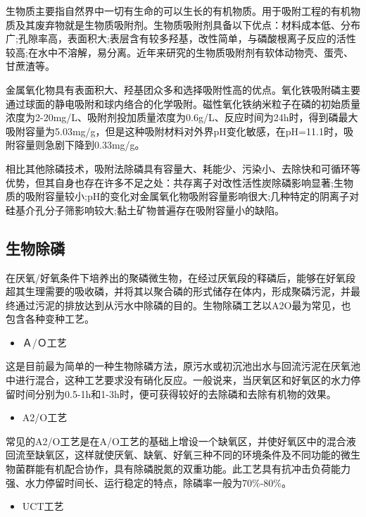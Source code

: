 \documentclass[
]{book}
\providecommand{\tightlist}{%
  \setlength{\itemsep}{0pt}\setlength{\parskip}{0pt}}
\begin{document}
生物质主要指自然界中一切有生命的可以生长的有机物质。用于吸附工程的有机物质及其废弃物就是生物质吸附剂。生物质吸附剂具备以下优点：材料成本低、分布广;孔隙率高，表面积大;表层含有较多羟基，改性简单，与磷酸根离子反应的活性较高;在水中不溶解，易分离。近年来研究的生物质吸附剂有软体动物壳、蛋壳、甘蔗渣等。

金属氧化物具有表面积大、羟基团众多和选择吸附性高的优点。氧化铁吸附磷主要通过球面的静电吸附和球内络合的化学吸附。磁性氧化铁纳米粒子在磷的初始质量浓度为2-20mg/L、吸附剂投加质量浓度为0.6g/L、反应时间为24h时，得到磷最大吸附容量为5.03mg/g，但是这种吸附材料对外界pH变化敏感，在pH=11.1时，吸附容量则急剧下降到0.33mg/g。

相比其他除磷技术，吸附法除磷具有容量大、耗能少、污染小、去除快和可循环等优势，但其自身也存在许多不足之处：共存离子对改性活性炭除磷影响显著;生物质的吸附容量较小;pH的变化对金属氧化物吸附容量影响很大;几种特定的阴离子对硅基介孔分子筛影响较大;黏土矿物普遍存在吸附容量小的缺陷。

\hypertarget{ux751fux7269ux9664ux78f7}{%
\subsection{生物除磷}\label{ux751fux7269ux9664ux78f7}}

在厌氧/好氧条件下培养出的聚磷微生物，在经过厌氧段的释磷后，能够在好氧段超其生理需要的吸收磷，并将其以聚合磷的形式储存在体内，形成聚磷污泥，并最终通过污泥的排放达到从污水中除磷的目的。生物除磷工艺以A2O最为常见，也包含各种变种工艺。

\begin{itemize}
\tightlist
\item
  Ａ/Ｏ工艺
\end{itemize}

这是目前最为简单的一种生物除磷方法，原污水或初沉池出水与回流污泥在厌氧池中进行混合，这种工艺要求没有硝化反应。一般说来，当厌氧区和好氧区的水力停留时间分别为0.5-1h和1-3h时，便可获得较好的去除磷和去除有机物的效果。

\begin{itemize}
\tightlist
\item
  A2/O工艺
\end{itemize}

常见的A2/O工艺是在A/O工艺的基础上增设一个缺氧区，并使好氧区中的混合液回流至缺氧区，这样就使厌氧、缺氧、好氧三种不同的环境条件及不同功能的微生物菌群能有机配合协作，具有除磷脱氮的双重功能。此工艺具有抗冲击负荷能力强、水力停留时间长、运行稳定的特点，除磷率一般为70\%-80\%。

\begin{itemize}
\tightlist
\item
  UCT工艺
\end{itemize}
\end{document}
